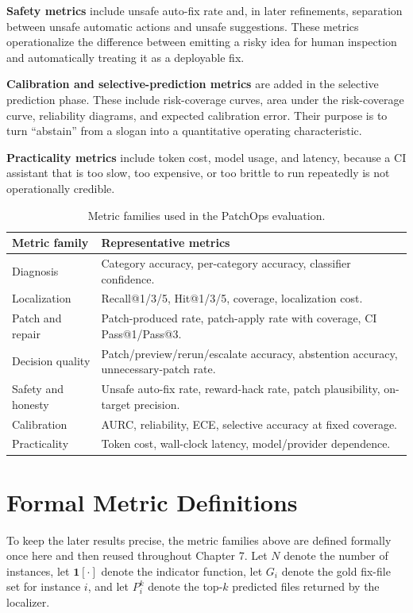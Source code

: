 \textbf{Safety metrics} include unsafe auto-fix rate and, in later refinements, separation between unsafe
automatic actions and unsafe suggestions. These metrics operationalize the difference between emitting a risky
idea for human inspection and automatically treating it as a deployable fix.

\textbf{Calibration and selective-prediction metrics} are added in the selective prediction phase. These include
risk-coverage curves, area under the risk-coverage curve, reliability diagrams, and expected calibration error.
Their purpose is to turn ``abstain'' from a slogan into a quantitative operating characteristic.

\textbf{Practicality metrics} include token cost, model usage, and latency, because a CI assistant that is too
slow, too expensive, or too brittle to run repeatedly is not operationally credible.

\begin{table}[!htbp]
\centering
\caption{Metric families used in the PatchOps evaluation.}
\label{tab:metric-families}
\begin{tabular}{p{}p{}}
\toprule
Metric family & Representative metrics \\
\midrule
Diagnosis & Category accuracy, per-category accuracy, classifier confidence. \\
Localization & Recall@1/3/5, Hit@1/3/5, coverage, localization cost. \\
Patch and repair & Patch-produced rate, patch-apply rate with coverage, CI Pass@1/Pass@3. \\
Decision quality & Patch/preview/rerun/escalate accuracy, abstention accuracy, unnecessary-patch rate. \\
Safety and honesty & Unsafe auto-fix rate, reward-hack rate, patch plausibility, on-target precision. \\
Calibration & AURC, reliability, ECE, selective accuracy at fixed coverage. \\
Practicality & Token cost, wall-clock latency, model/provider dependence. \\
\bottomrule
\end{tabular}
\end{table}

\section{Formal Metric Definitions}

To keep the later results precise, the metric families above are defined formally once here and then reused
throughout Chapter 7. Let \(N\) denote the number of instances, let \(\mathbf{1}[\cdot]\) denote the indicator
function, let \(G_i\) denote the gold fix-file set for instance \(i\), and let \(P_i^k\) denote the top-\(k\)
predicted files returned by the localizer.

